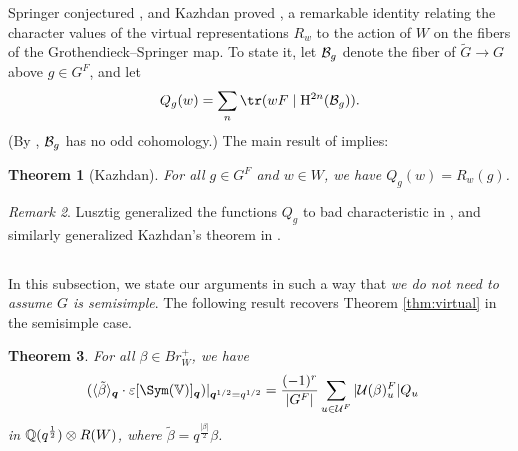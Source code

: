 \documentclass[a4paper,10pt,leqno]{amsart}
\theoremstyle{plain}
\theoremstyle{plain}
\newtheorem{thm}{Theorem}[subsection]
\theoremstyle{plain}
\theoremstyle{definition}
\theoremstyle{remark}
\newtheorem{rem}[thm]{Remark}
\newcommand{\Br}{\mathit{Br}}
\newcommand{\Q}{\bm{q}}
\newcommand{\Tr}[1]{\langle{#1}\rangle_{\Q}}
\begin{document}
Springer conjectured \cite{springer_1976}, and Kazhdan proved \cite{kazhdan}, a remarkable identity relating the character values of the virtual representations $R_w$ to the action of $W$ on the fibers of the Grothendieck--Springer map.
To state it, let $\cal{B}_g$ denote the fiber of $\tilde{G} \to G$ above $g \in G^F$, and let
\begin{align}
Q_g(w) = \sum_n
{\tr(wF \mid \ur{H}^{2n}(\cal{B}_g))}.
\end{align}
(By \cite{dlp}, $\cal{B}_g$ has no odd cohomology.)
The main result of \cite{kazhdan} implies:

\begin{thm}[Kazhdan]\label{thm:kazhdan}
For all $g \in G^F$ and $w \in W$, we have $Q_g(w) = R_w(g)$.
\end{thm}

\begin{rem}
Lusztig generalized the functions $Q_g$ to bad characteristic in \cite{lusztig_1981}, and similarly generalized Kazhdan's theorem in \cite{lusztig_1990}.
\end{rem}

\subsection{}

In this subsection, we state our arguments in such a way that \emph{we do not need to assume $G$ is semisimple}.
The following result recovers Theorem \ref{thm:virtual} in the semisimple case.

\begin{thm}\label{thm:virtual-reductive}
For all $\beta \in \Br_W^+$, we have
\begin{align}
(\Tr{\tilde{\beta}} \cdot \varepsilon[\Sym(\bb{V})]_{\Q})|_{\Q^{1/2} = q^{1/2}}
&= \frac{(-1)^{r}}{|G^F|}
	\sum_{u \in \cal{U}^F}
	|\cal{U}(\beta)_u^F| Q_u
\end{align}
in $\bb{Q}(q^{\frac{1}{2}}) \otimes R(W)$, where $\tilde{\beta} = q^{\frac{|\beta|}{2}} \beta$.
\end{thm}
\end{document}
